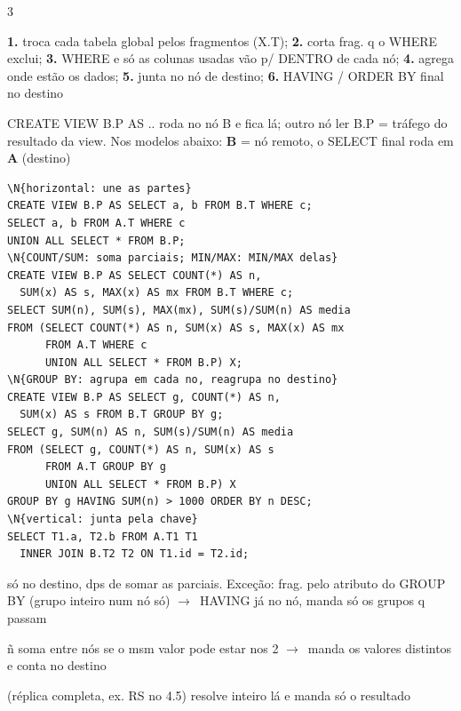 \documentclass[a4paper]{article}
\newenvironment{dl}{\begin{description}[leftmargin=3.2mm,labelindent=0pt,itemsep=0.7pt,topsep=0.6pt,font=\color{tm}\bfseries,style=standard]}{\end{description}}
\newcommand{\h}[1]{\par\vspace{2.2pt}{\setlength{\fboxsep}{0.9pt}\colorbox{hd}{\parbox{\dimexpr\linewidth-1.8pt}{\color{white}\bfseries\ #1}}}\par\vspace{0.8pt}}
\newcommand{\go}{$\rightarrow$}
\newcommand{\q}[1]{{\ttfamily #1}}
\newcommand{\N}[1]{\textcolor{nd}{\textbf{#1}}}
\begin{document}
\begin{multicols*}{3}
\h{SGBDD: JUNTAR CONSULTAS ENTRE NÓS}
\begin{dl}
\item[passo a passo:] \textbf{1.} troca cada tabela global pelos fragmentos (\q{X.T}); \textbf{2.} corta frag. q o WHERE exclui; \textbf{3.} WHERE e só as colunas usadas vão p/ DENTRO de cada nó; \textbf{4.} agrega onde estão os dados; \textbf{5.} junta no nó de destino; \textbf{6.} HAVING / ORDER BY final no destino
\item[view:] \q{CREATE VIEW B.P AS ..} roda no nó B e fica lá; outro nó ler \q{B.P} = tráfego do resultado da view. Nos modelos abaixo: \N{B} = nó remoto, o SELECT final roda em \N{A} (destino)
\end{dl}
\begin{sql}
\begin{Verbatim}
\N{horizontal: une as partes}
CREATE VIEW B.P AS SELECT a, b FROM B.T WHERE c;
SELECT a, b FROM A.T WHERE c
UNION ALL SELECT * FROM B.P;
\N{COUNT/SUM: soma parciais; MIN/MAX: MIN/MAX delas}
CREATE VIEW B.P AS SELECT COUNT(*) AS n,
  SUM(x) AS s, MAX(x) AS mx FROM B.T WHERE c;
SELECT SUM(n), SUM(s), MAX(mx), SUM(s)/SUM(n) AS media
FROM (SELECT COUNT(*) AS n, SUM(x) AS s, MAX(x) AS mx
      FROM A.T WHERE c
      UNION ALL SELECT * FROM B.P) X;
\N{GROUP BY: agrupa em cada no, reagrupa no destino}
CREATE VIEW B.P AS SELECT g, COUNT(*) AS n,
  SUM(x) AS s FROM B.T GROUP BY g;
SELECT g, SUM(n) AS n, SUM(s)/SUM(n) AS media
FROM (SELECT g, COUNT(*) AS n, SUM(x) AS s
      FROM A.T GROUP BY g
      UNION ALL SELECT * FROM B.P) X
GROUP BY g HAVING SUM(n) > 1000 ORDER BY n DESC;
\N{vertical: junta pela chave}
SELECT T1.a, T2.b FROM A.T1 T1
  INNER JOIN B.T2 T2 ON T1.id = T2.id;
\end{Verbatim}
\end{sql}
\begin{dl}
\item[HAVING:] só no destino, dps de somar as parciais. Exceção: frag. pelo atributo do GROUP BY (grupo inteiro num nó só) \go\ HAVING já no nó, manda só os grupos q passam
\item[COUNT(DISTINCT):] ñ soma entre nós se o msm valor pode estar nos 2 \go\ manda os valores distintos e conta no destino
\item[1 nó c/ tudo:] (réplica completa, ex. RS no 4.5) resolve inteiro lá e manda só o resultado
\end{dl}
\end{multicols*}
\end{document}
